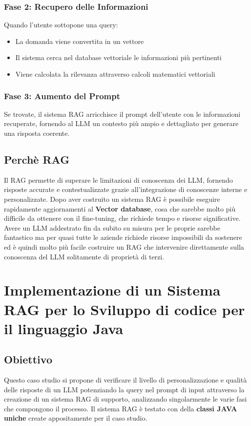 \documentclass[12pt,a4paper,openright,twoside]{book}
\begin{document}
\subsection{Fase 2: Recupero delle Informazioni}
Quando l'utente sottopone una query:
\begin{itemize}
    \item La domanda viene convertita in un vettore
    \item Il sistema cerca nel database vettoriale le informazioni più pertinenti
    \item Viene calcolata la rilevanza attraverso calcoli matematici vettoriali
\end{itemize}

\subsection{Fase 3: Aumento del Prompt}
Se trovate, il sistema RAG arricchisce il prompt dell'utente con le informazioni recuperate, fornendo al LLM un contesto più ampio e dettagliato per generare una risposta coerente.

\section{Perchè RAG}
Il RAG permette di superare le limitazioni di conoscenza dei LLM, fornendo risposte accurate e contestualizzate 
grazie all'integrazione di conoscenze interne e personalizzate.
Dopo aver costruito un sistema RAG è possibile eseguire rapidamente aggiornamenti al \textbf{Vector database},
cosa che sarebbe molto più difficile da ottenere con il fine-tuning, che richiede tempo e risorse significative.
Avere un LLM addestrato fin da subito su misura per le proprie sarebbe fantastico ma per quasi
tutte le aziende richiede risorse impossibili da sostenere ed è quindi molto più facile costruire un RAG
che intervenire direttamente sulla conoscenza del LLM solitamente di proprietà di terzi.

\chapter{Implementazione di un Sistema RAG per lo Sviluppo di codice per il linguaggio Java}
\section{Obiettivo}
Questo caso studio si propone di verificare il livello di personalizzazione e qualità delle risposte di un LLM potenziando la query nel prompt di input 
attraverso la creazione di un sistema RAG di supporto, analizzando singolarmente le varie fasi che compongono il processo.
Il sistema RAG è testato con della \textbf{classi JAVA uniche} create appositamente per il caso studio.
\end{document}
